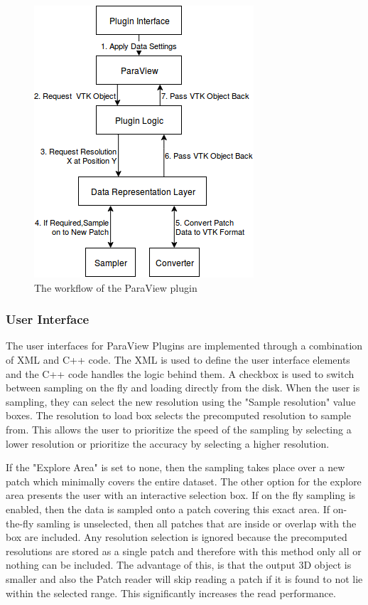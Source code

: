 \documentclass[12pt,a4paper]{article}
\begin{document}
\begin{figure}[h]
\centering
\includegraphics[scale=0.7]{solution-workflow}
\caption{The workflow of the ParaView plugin}
\end{figure}

\subsubsection{User Interface}

The user interfaces for ParaView Plugins are implemented through a combination of XML and C++ code. The XML is used to define the user interface elements and the C++ code handles the logic behind them. A checkbox is used to switch between sampling on the fly and loading directly from the disk. When the user is sampling, they can select the new resolution using the "Sample resolution" value boxes. The resolution to load box selects the precomputed resolution to sample from. This allows the user to prioritize the speed of the sampling by selecting a lower resolution or prioritize the accuracy by selecting a higher resolution.

If the "Explore Area" is set to none, then the sampling takes place over a new patch which minimally covers the entire dataset. The other option for the explore area presents the user with an interactive selection box. If on the fly sampling is enabled, then the data is sampled onto a patch covering this exact area. If on-the-fly samling is unselected, then all patches that are inside or overlap with the box are included. Any resolution selection is ignored because the precomputed resolutions are stored as a single patch and therefore with this method only all or nothing can be included. The advantage of this, is that the output 3D object is smaller and also the Patch reader will skip reading a patch if it is found to not lie within the selected range. This significantly increases the read performance.
\end{document}
